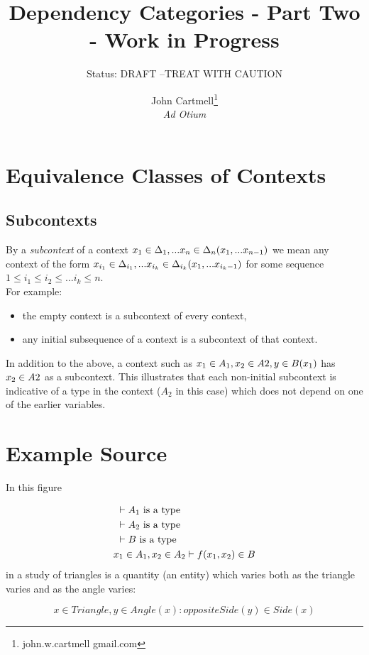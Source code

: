 \documentclass[10pt,a4paper]{scrartcl}
\title{Dependency Categories - Part Two - Work in Progress}
\author{John Cartmell\footnote{john.w.cartmell gmail.com}\\ \normalsize{\textit{Ad Otium}}}
\subtitle{Status: \normalsize{DRAFT --TREAT WITH CAUTION}}
\begin{document}
\maketitle

\section{Equivalence Classes of Contexts}
\subsection{Subcontexts}
By a \textit{subcontext} of a context $x_1 \in \Delta_1,... x_{n} \in \Delta_{n}(x_1,...x_{n-1})$ we mean any context
of the form
$x_{i_1} \in {\Delta}_{i_1},... x_{i_k} \in {\Delta}_{i_k}(x_1,...x_{i_k-1})$ for some sequence 
$1 \leq i_1 \leq i_2 \leq ... i_k \leq n$. \\

\noindent
For example:
\begin {itemize}
\item the empty context  is a subcontext of every 
context,
\item any initial subsequence of a context is a subcontext of that context.
\end{itemize}

\noindent
In addition to the above, a context such as $x_1 \in A_1,x_2 \in A2,y \in B(x_1)$ has 
$x_2 \in A2$ as a subcontext. This illustrates that each non-initial subcontext is indicative of a type in the context ($A_2$ in this case)
which does not depend on one of the earlier variables.
 

\section{Example Source}
\noindent In this figure

\begin{align*}
&\text{                                  }\vdash A_1\mbox{ is a type} \\
&\text{                                  }\vdash A_2\mbox{ is a type} \\
&\text{                                  }\vdash B\mbox{ is a type} \\
&x_1 \in A_1,x_2 \in A_2 \vdash f(x_1,x_2) \in B 
\end{align*}
\noindent
 in a study of triangles is a quantity (an entity)  which varies both as the triangle varies and as the angle varies:

\begin{equation*}
x \in Triangle, y \in Angle(x): oppositeSide(y) \in Side(x)
\end{equation*}
\end{document}

